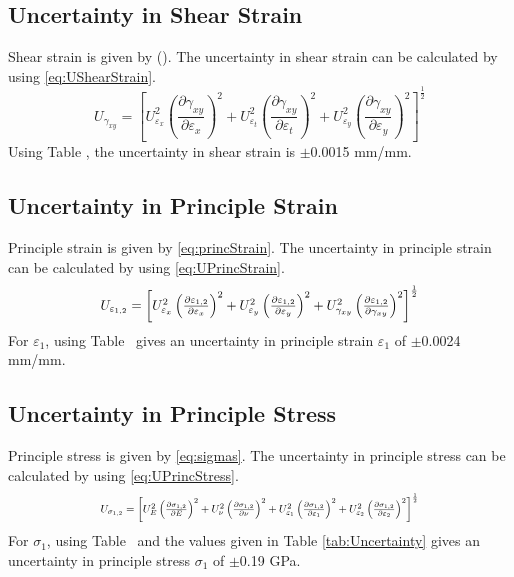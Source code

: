 \documentclass[10pt,journal,letterpaper]{IEEEtran}
\begin{document}
\subsection*{Uncertainty in Shear Strain}

Shear strain is given by (\todo).
The uncertainty in shear strain can be calculated by using \eqref{eq:UShearStrain}.
\begin{equation}
\label{eq:UShearStrain}
U_{\gamma_{xy}}=\left[U_{\varepsilon_x}^2 \left(\frac{\partial \gamma_{xy}}{\partial \varepsilon_x}\right)^2 + U_{\varepsilon_t}^2 \left(\frac{\partial \gamma_{xy}}{\partial \varepsilon_t}\right)^2 + U_{\varepsilon_y}^2 \left(\frac{\partial \gamma_{xy}}{\partial \varepsilon_y}\right)^2 \right]^{\frac{1}{2}}
\end{equation}
Using Table \todo, the uncertainty in shear strain is $\pm$0.0015 mm/mm.

\subsection*{Uncertainty in Principle Strain}

Principle strain is given by \eqref{eq:princStrain}.
The uncertainty in principle strain can be calculated by using \eqref{eq:UPrincStrain}.
\begin{equation}
\label{eq:UPrincStrain}
\resizebox{227pt}{!}{$U_{\varepsilon_{1,2}}=\left[U_{\varepsilon_x}^2 \left(\frac{\partial \varepsilon_{1,2}}{\partial \varepsilon_x}\right)^2 + U_{\varepsilon_y}^2 \left(\frac{\partial \varepsilon_{1,2}}{\partial \varepsilon_y}\right)^2 + U_{\gamma_{xy}}^2 \left(\frac{\partial \varepsilon_{1,2}}{\partial \gamma_{xy}}\right)^2 \right]^{\frac{1}{2}}$}
\end{equation}
For $\varepsilon_1$, using Table \todo\ gives an uncertainty in principle strain $\varepsilon_1$ of $\pm$0.0024 mm/mm.

\subsection*{Uncertainty in Principle Stress}

Principle stress is given by \eqref{eq:sigmas}.
The uncertainty in principle stress can be calculated by using \eqref{eq:UPrincStress}.
\begin{equation}
\label{eq:UPrincStress}
\resizebox{227pt}{!}{$U_{\sigma_{1,2}}=\left[U_{E}^2 \left(\frac{\partial \sigma_{1,2}}{\partial E}\right)^2 + U_{\nu}^2 \left(\frac{\partial \sigma_{1,2}}{\partial \nu}\right)^2 + U_{\varepsilon_1}^2 \left(\frac{\partial \sigma_{1,2}}{\partial \varepsilon_1}\right)^2 + U_{\varepsilon_2}^2 \left(\frac{\partial \sigma_{1,2}}{\partial \varepsilon_2}\right)^2 \right]^{\frac{1}{2}}$}
\end{equation}
For $\sigma_1$, using Table \todo\ and the values given in Table \ref{tab:Uncertainty} gives an uncertainty in principle stress $\sigma_1$ of $\pm$0.19 GPa.
\end{document}
